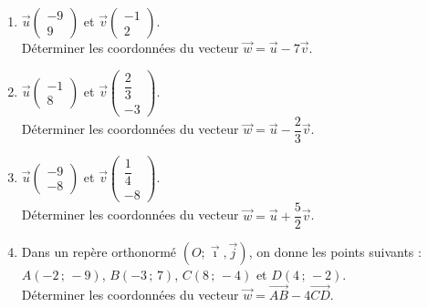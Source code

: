 {\begin{Exercice}
\begin{enumerate}[itemsep=1em]
	\item \begin{minipage}[t]{\linewidth} $\overrightarrow{u}\begin{pmatrix}-9\\9\end{pmatrix}$ et $\overrightarrow{v}\begin{pmatrix}-1\\2\end{pmatrix}$.\\Déterminer les coordonnées du vecteur $\overrightarrow{w}=\overrightarrow{u}-7\overrightarrow{v}$.\end{minipage}
	\item \begin{minipage}[t]{\linewidth} $\overrightarrow{u}\begin{pmatrix}-1\\[0.7em]8\end{pmatrix}$ et $\overrightarrow{v}\begin{pmatrix}\dfrac{2}{3}\\[0.7em]-3\end{pmatrix}$.\\Déterminer les coordonnées du vecteur $\overrightarrow{w}=\overrightarrow{u}-\dfrac{2}{3}\overrightarrow{v}$.\end{minipage}
	\item \begin{minipage}[t]{\linewidth} $\overrightarrow{u}\begin{pmatrix}-9\\[0.7em]-8\end{pmatrix}$ et $\overrightarrow{v}\begin{pmatrix}\dfrac{1}{4}\\[0.7em]-8\end{pmatrix}$.\\Déterminer les coordonnées du vecteur $\overrightarrow{w}=\overrightarrow{u}+\dfrac{5}{2}\overrightarrow{v}$.\end{minipage}
	\item \begin{minipage}[t]{\linewidth}Dans un repère orthonormé $(O;\vec \imath, \overrightarrow{j})$, on donne les points suivants : $A\left(-2\,;\,-9\right)$, $B\left(-3\,;\,7\right)$, $C\left(8\,;\,-4\right)$ et $D\left(4\,;\,-2\right)$.\\Déterminer les coordonnées du vecteur $\overrightarrow{w}=\overrightarrow{AB}-4\overrightarrow{CD}$.\end{minipage}
\end{enumerate}
\end{Exercice}

}
